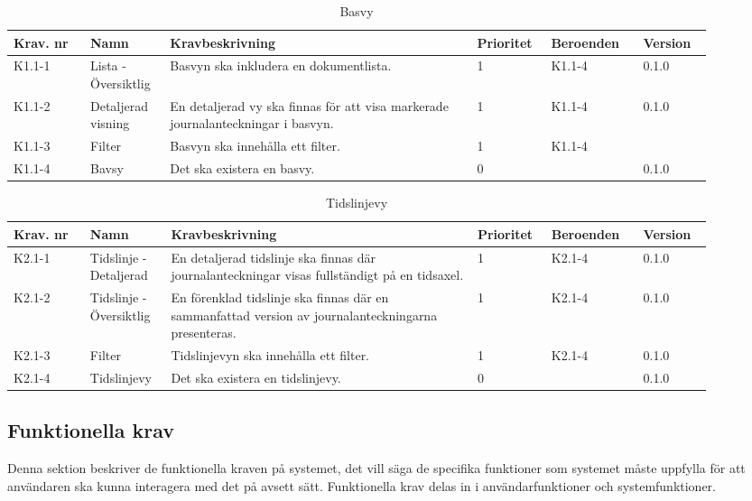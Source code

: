 \documentclass{article}
\begin{document}
\begin{table}[H] 
    \caption{Basvy}
    \label{tab:anvandargranssnitt}
    \centering
    \begin{tabular}{|p{0.1\linewidth}|p{0.1\linewidth}|p{0.4\linewidth}|p{0.09\linewidth}|p{0.12\linewidth}|p{0.09\linewidth}|}
        \hline
        \textbf{Krav. nr} & \textbf{Namn} & \textbf{Kravbeskrivning} & \textbf{Prioritet} & \textbf{Beroenden}  & \textbf{Version} \\ \hline
        K1.1-1 & Lista - Översiktlig & Basvyn ska inkludera en dokumentlista. & 1 & K1.1-4 & 0.1.0 \\ \hline
        K1.1-2 & Detaljerad visning & En detaljerad vy ska finnas för att visa markerade journalanteckningar i basvyn. & 1 & K1.1-4 & 0.1.0\\ \hline
        K1.1-3 & Filter & Basvyn ska innehålla ett filter. & 1 & K1.1-4 &\\ \hline
        K1.1-4 & Bavsy & Det ska existera en basvy. & 0 & & 0.1.0\\ \hline
    \end{tabular}
\end{table}

\begin{table}[H] 
    \caption{Tidslinjevy}
    \label{tab:anvandargranssnitt}
    \centering
    \begin{tabular}{|p{0.1\linewidth}|p{0.1\linewidth}|p{0.4\linewidth}|p{0.09\linewidth}|p{0.12\linewidth}|p{0.09\linewidth}|}
        \hline
        \textbf{Krav. nr} & \textbf{Namn} & \textbf{Kravbeskrivning} & \textbf{Prioritet} & \textbf{Beroenden}  & \textbf{Version} \\ \hline
        K2.1-1 & Tidslinje - Detaljerad & En detaljerad tidslinje ska finnas där journalanteckningar visas fullständigt på en tidsaxel. & 1 & K2.1-4 & 0.1.0\\ \hline
        K2.1-2 & Tidslinje - Översiktlig & En förenklad tidslinje ska finnas där en sammanfattad version av journalanteckningarna presenteras. & 1 & K2.1-4 & 0.1.0\\ \hline
        K2.1-3 & Filter & Tidslinjevyn ska innehålla ett filter. & 1 & K2.1-4 & 0.1.0\\ \hline
        K2.1-4 & Tidslinjevy & Det ska existera en tidslinjevy. & 0 & & 0.1.0\\ \hline
    \end{tabular}
\end{table}

\newpage
\subsection{Funktionella krav}
Denna sektion beskriver de funktionella kraven på systemet, det vill säga de specifika funktioner som systemet måste uppfylla för att användaren ska kunna interagera med det på avsett sätt. Funktionella krav delas in i användarfunktioner och systemfunktioner.
\end{document}
